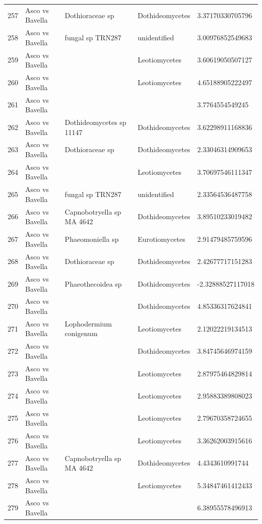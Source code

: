 \documentclass[12pt]{article}\usepackage[]{graphicx}\usepackage[]{color}
\numberwithin{figure}{section}
\begin{document}
\begin{table}[ht]
\begin{tabular}{lllll}
  257 & Asco vs Bavella & Dothioraceae sp & Dothideomycetes & 3.37170330705796 \\ 
  258 & Asco vs Bavella & fungal sp TRN287 & unidentified & 3.00976852549683 \\ 
  259 & Asco vs Bavella &  & Leotiomycetes & 3.60619050507127 \\ 
  260 & Asco vs Bavella &  & Leotiomycetes & 4.65188905222497 \\ 
  261 & Asco vs Bavella &  &  & 3.7764554549245 \\ 
  262 & Asco vs Bavella & Dothideomycetes sp 11147 & Dothideomycetes & 3.62298911168836 \\ 
  263 & Asco vs Bavella & Dothioraceae sp & Dothideomycetes & 2.33046314909653 \\ 
  264 & Asco vs Bavella &  & Leotiomycetes & 3.70697546111347 \\ 
  265 & Asco vs Bavella & fungal sp TRN287 & unidentified & 2.33564536487758 \\ 
  266 & Asco vs Bavella & Capnobotryella sp MA 4642 & Dothideomycetes & 3.89510233019482 \\ 
  267 & Asco vs Bavella & Phaeomoniella sp & Eurotiomycetes & 2.91479485759596 \\ 
  268 & Asco vs Bavella & Dothioraceae sp & Dothideomycetes & 2.42677717151283 \\ 
  269 & Asco vs Bavella & Phaeothecoidea sp & Dothideomycetes & -2.32888527117018 \\ 
  270 & Asco vs Bavella &  & Dothideomycetes & 4.85336317624841 \\ 
  271 & Asco vs Bavella & Lophodermium conigenum & Leotiomycetes & 2.12022219134513 \\ 
  272 & Asco vs Bavella &  & Dothideomycetes & 3.84745646974159 \\ 
  273 & Asco vs Bavella &  & Leotiomycetes & 2.87975464829814 \\ 
  274 & Asco vs Bavella &  & Leotiomycetes & 2.95883389808023 \\ 
  275 & Asco vs Bavella &  & Leotiomycetes & 2.79670358724655 \\ 
  276 & Asco vs Bavella &  & Leotiomycetes & 3.36262003915616 \\ 
  277 & Asco vs Bavella & Capnobotryella sp MA 4642 & Dothideomycetes & 4.4343610991744 \\ 
  278 & Asco vs Bavella &  & Leotiomycetes & 5.34847461412433 \\ 
  279 & Asco vs Bavella &  &  & 6.38955578496913 \\ 

\end{tabular}
\end{table}
\end{document}
